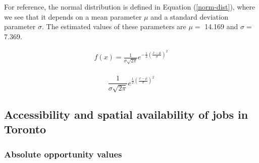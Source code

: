 \documentclass[10pt,letterpaper]{article}
\begin{document}
For reference, the normal distribution is defined in Equation
(\ref{norm-dist}), where we see that it depends on a mean parameter
\(\mu\) and a standard deviation parameter \(\sigma\). The estimated
values of these parameters are \(\mu=\) 14.169 and \(\sigma =\) 7.369.

\begin{equation}
\label{norm-dist}
\begin{array}{l} 
f(x) = \frac{1}{\sigma \sqrt{2\pi}}e^{-\frac{1}{2}(\frac{x-\mu}{\sigma})^2}\\
\end{array}
\end{equation}

\[
\frac{1}{\sigma \sqrt{2\pi}}e^{\frac{1}{2}(\frac{x-\mu}{\sigma})^2}
\]

\hypertarget{accessibility-and-spatial-availability-of-jobs-in-toronto}{%
\subsection{Accessibility and spatial availability of jobs in
Toronto}\label{accessibility-and-spatial-availability-of-jobs-in-toronto}}

\hypertarget{absolute-opportunity-values}{%
\subsubsection{Absolute opportunity
values}\label{absolute-opportunity-values}}
\end{document}
